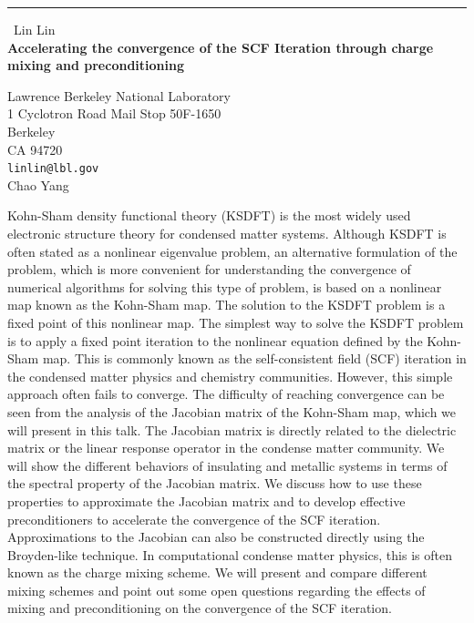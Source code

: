 \documentclass{report}
\begin{document}
\begin{center}
\rule{6in}{1pt} \
{\large Lin Lin \\
{\bf Accelerating the convergence of the SCF Iteration through charge mixing and preconditioning}}

Lawrence Berkeley National Laboratory \\ 1 Cyclotron Road Mail Stop 50F-1650 \\ Berkeley \\ CA 94720
\\
{\tt linlin@lbl.gov}\\
Chao Yang\end{center}

Kohn-Sham density functional theory (KSDFT) is the most widely used
electronic structure theory for condensed matter systems. Although KSDFT
is often stated as a nonlinear eigenvalue problem, an alternative
formulation of the problem, which is more convenient for understanding
the convergence of numerical algorithms for solving this type of problem,
is based on a nonlinear map known as the Kohn-Sham map. The solution to
the KSDFT problem is a fixed point of this nonlinear map. The simplest
way to solve the KSDFT problem is to apply a fixed point iteration to the
nonlinear equation defined by the Kohn-Sham map. This is commonly known
as the self-consistent field (SCF) iteration in the condensed matter
physics and chemistry communities. However, this simple approach often
fails to converge. The difficulty of reaching convergence can be seen
from the analysis of the Jacobian matrix of the Kohn-Sham map, which we
will present in this talk. The Jacobian matrix is directly related to the
dielectric matrix or the linear response operator in the condense matter
community. We will show the different behaviors of insulating and
metallic systems in terms of the spectral property of the Jacobian
matrix. We discuss how to use these properties to approximate the
Jacobian matrix and to develop effective preconditioners to accelerate
the convergence of the SCF iteration. Approximations to the Jacobian can
also be constructed directly using the Broyden-like technique. In
computational condense matter physics, this is often known as the charge
mixing scheme. We will present and compare different mixing schemes and
point out some open questions regarding the effects of mixing and
preconditioning on the convergence of the SCF iteration.
\end{document}
